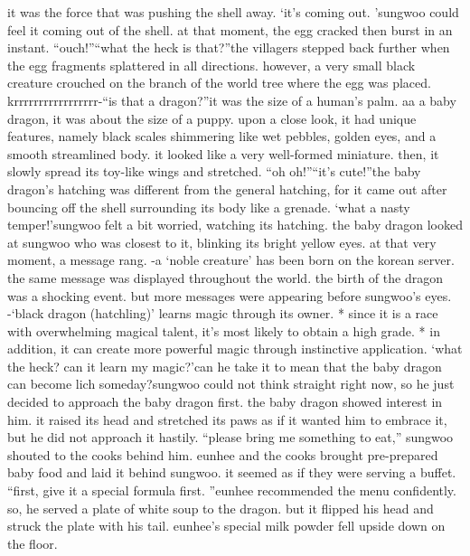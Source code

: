  it was the force that was pushing the shell away.
‘it’s coming out.
’sungwoo could feel it coming out of the shell.
at that moment, the egg cracked then burst in an instant.
“ouch!”“what the heck is that?”the villagers stepped back further when the egg fragments splattered in all directions.
however, a very small black creature crouched on the branch of the world tree where the egg was placed.
krrrrrrrrrrrrrrrrr-“is that a dragon?”it was the size of a human’s palm.
 aa a baby dragon, it was about the size of a puppy.
upon a close look, it had unique features, namely black scales shimmering like wet pebbles, golden eyes, and a smooth streamlined body.
 it looked like a very well-formed miniature.
then, it slowly spread its toy-like wings and stretched.
“oh oh!”“it’s cute!”the baby dragon’s hatching was different from the general hatching, for it came out after bouncing off the shell surrounding its body like a grenade.
‘what a nasty temper!’sungwoo felt a bit worried, watching its hatching.
the baby dragon looked at sungwoo who was closest to it, blinking its bright yellow eyes.
at that very moment, a message rang.
-a ‘noble creature’ has been born on the korean server.
the same message was displayed throughout the world.
 the birth of the dragon was a shocking event.
but more messages were appearing before sungwoo’s eyes.
-‘black dragon (hatchling)’ learns magic through its owner.
* since it is a race with overwhelming magical talent, it’s most likely to obtain a high grade.
* in addition, it can create more powerful magic through instinctive application.
‘what the heck? can it learn my magic?’can he take it to mean that the baby dragon can become lich someday?sungwoo could not think straight right now, so he just decided to approach the baby dragon first.
the baby dragon showed interest in him.
 it raised its head and stretched its paws as if it wanted him to embrace it, but he did not approach it hastily.
“please bring me something to eat,” sungwoo shouted to the cooks behind him.
eunhee and the cooks brought pre-prepared baby food and laid it behind sungwoo.
it seemed as if they were serving a buffet.
“first, give it a special formula first.
”eunhee recommended the menu confidently.
 so, he served a plate of white soup to the dragon.
 but it flipped his head and struck the plate with his tail.
 eunhee’s special milk powder fell upside down on the floor.



